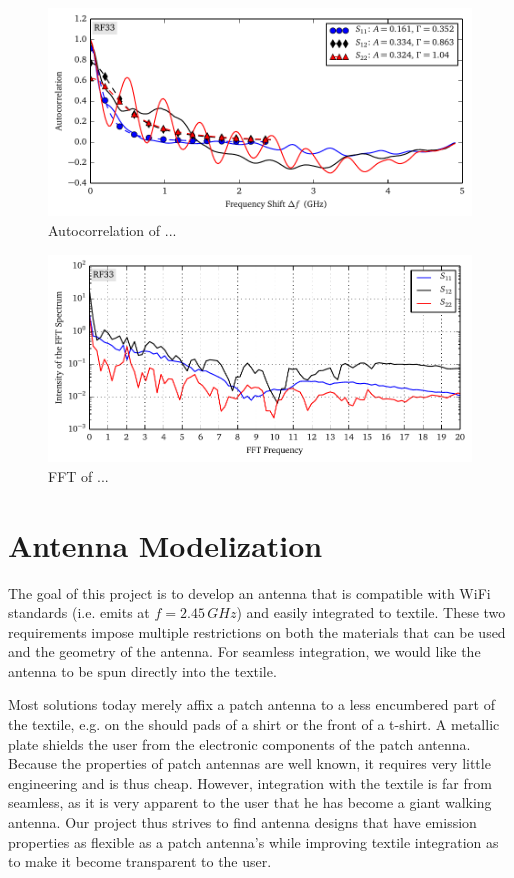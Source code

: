 \begin{figure}
 \centering
 \includegraphics{figs/active/RF33-autoCorrelation.pdf}
 \caption{Autocorrelation of ...}
\end{figure}

\begin{figure}
 \centering
 \includegraphics{figs/active/RF33-fft.pdf}
 \caption{FFT of ...}
\end{figure}

\section{Antenna Modelization}
The goal of this project is to develop an antenna that is compatible with 
WiFi standards (i.e. emits at $f=2.45\,\unit{GHz}$) and easily integrated
to textile. These two requirements impose multiple restrictions on both
the materials that can be used and the geometry of the antenna. For seamless
integration, we would like the antenna to be spun directly into the textile. 

Most solutions today merely affix a patch antenna to a less 
encumbered part of the textile, e.g. on the should pads of a shirt
or the front of a t-shirt.
A metallic plate shields the user from the electronic components 
of the patch antenna. Because the properties of patch antennas are
well known, it requires very little engineering and is thus cheap. However, integration 
with the textile is far from seamless, as it is very apparent to the
user that he has become a giant walking antenna. Our project thus 
strives to find antenna designs that have emission properties
as flexible as a patch antenna's while improving textile integration
as to make it become transparent to the user.

